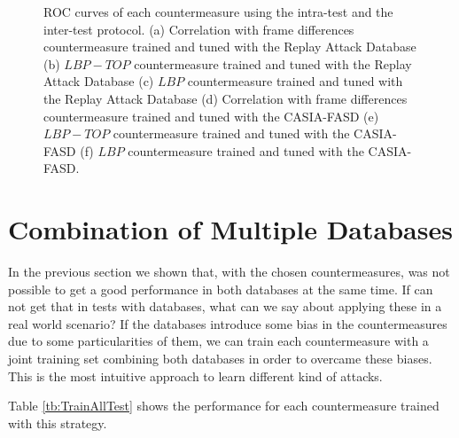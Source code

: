 \begin{figure}[ht]
\begin{center}
\caption{ROC curves of each countermeasure using the intra-test and the inter-test protocol. (a) Correlation with frame differences countermeasure trained and tuned with the Replay Attack Database (b) $LBP-TOP$ countermeasure trained and tuned with the Replay Attack Database (c) $LBP$ countermeasure trained and tuned with the Replay Attack Database (d) Correlation with frame differences countermeasure trained and tuned with the CASIA-FASD (e) $LBP-TOP$ countermeasure trained and tuned with the CASIA-FASD (f) $LBP$ countermeasure trained and tuned with the CASIA-FASD.} 
\label{fig:ROC_cross}
\end{center}
\end{figure}


\section{Combination of Multiple Databases}
\label{sec:combination}

In the previous section we shown that, with the chosen countermeasures, was not possible to get a good performance in both databases at the same time. If can not get that in tests with databases, what can we say about applying these in a real world scenario? If the databases introduce some bias in the countermeasures due to some particularities of them, we can train each countermeasure with a joint training set combining both databases in order to overcame these biases. This is the most intuitive approach to learn different kind of attacks. 


Table \ref{tb:TrainAllTest} shows the performance for each countermeasure trained with this strategy. %

